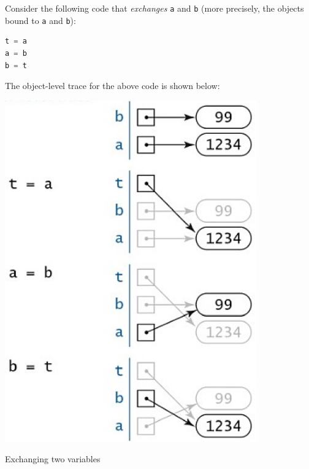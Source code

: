 \documentclass[8pt,a4paper,compress,handout]{beamer}
\begin{document}
\begin{frame}[fragile]
Consider the following code that \emph{exchanges} \lstinline{a} and \lstinline{b} (more precisely, the objects bound to \lstinline{a} and \lstinline{b}):

\begin{lstlisting}[language=Python]
t = a
a = b
b = t
\end{lstlisting}

The object-level trace for the above code is shown below:
\begin{center}
\includegraphics[scale=0.25]{figures/object_level_trace.png}

\smallskip

\tiny Exchanging two variables
\end{center}

\end{frame}
\end{document}
